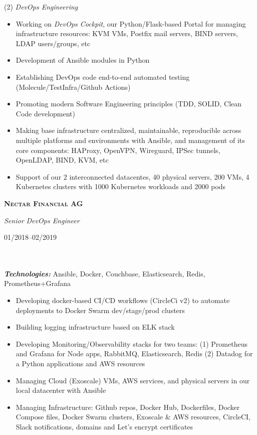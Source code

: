 \documentclass[$fontsize$, a4paper]{article}
\newcommand\textbox[1]{%
  \parbox{.333\textwidth}{#1}%
}
\begin{document}
(2) \emph{DevOps Engineering}
\begin{itemize}
  \setlength\itemsep{0em}
  \item Working on \textit{DevOps Cockpit}, our Python/Flask-based Portal for managing infrastructure resources: KVM VMs, Postfix mail servers, BIND servers, LDAP users/groups, etc
  \item Development of Ansible modules in Python
  \item Establishing DevOps code end-to-end automated testing (Molecule/TestInfra/Github Actions)
  \item Promoting modern Software Engineering principles (TDD, SOLID, Clean Code development)
  \item Making base infrastructure centralized, maintainable, reproducible across multiple platforms and environments with Ansible, and management of its core components: HAProxy, OpenVPN, Wireguard, IPSec tunnels, OpenLDAP, BIND, KVM, etc
  \item Support of our 2 interconnected datacentes, 40 physical servers, 200 VMs, 4 Kubernetes clusters with 1000 Kubernetes workloads and 2000 pods
\end{itemize}


\pagebreak


\noindent\textbox{\textbf{\textsc{Nectar Financial AG}}\hfill}\textbox{\hfil \emph{Senior DevOps Engineer}\hfil}\textbox{\hfill 01/2018--02/2019}\\\\
\textbf{\textit{Technologies:}} Ansible, Docker, Couchbase, Elasticsearch, Redis, Prometheus+Grafana

\vspace{1pt}
\begin{itemize}
  \setlength\itemsep{-0.2em}
  \item Developing docker-based CI/CD workflows (CircleCi v2) to automate deployments to Docker Swarm dev/stage/prod clusters
  \item Building logging infrastructure based on ELK stack 
  \item Developing Monitoring/Observability stacks for two teams: (1) Prometheus and Grafana for Node apps, RabbitMQ, Elasticsearch, Redis (2) Datadog for a Python applications and AWS resources
  \item Managing Cloud (Exoscale) VMs, AWS services, and physical servers in our local datacenter with Ansible
  \item Managing Infrastructure: Github repos, Docker Hub, Dockerfiles, Docker Compose files, Docker Swarm clusters, Exoscale \& AWS resources, CircleCI, Slack notifications, domains and Let's encrypt certificates
\end{itemize}
\end{document}
